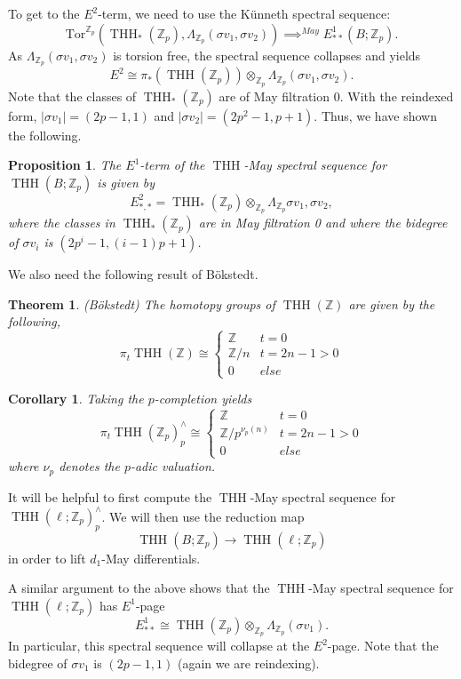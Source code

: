 \documentclass[12pt]{amsart}
\newcommand{\Z}{\mathbb{Z}}
\DeclareMathOperator{\THH}{THH}
\newtheorem{thm}[equation]{Theorem}
\newtheorem{cor}[equation]{Corollary}
\newtheorem{prop}[equation]{Proposition}
\theoremstyle{definition}
\numberwithin{equation}{section}
\numberwithin{figure}{section}
\begin{document}
To get to the $E^2$-term, we need to use the K\"unneth spectral sequence:
\[
\mathrm{Tor}^{\Z_p}(\THH_*(\Z_p), \Lambda_{\Z_p}(\sigma v_1, \sigma v_2))\implies ^{May}E^1_{**}(B;\Z_p).
\]
As $\Lambda_{\Z_p}(\sigma v_1, \sigma v_2)$ is torsion free, the spectral sequence collapses and yields
\[
E^2\cong \pi_*(\THH(\Z_p))\otimes_{\Z_p}\Lambda_{\Z_p}(\sigma v_1, \sigma v_2).
\]
Note that the classes of $\THH_*(\Z_p)$ are of May filtration 0. With the reindexed form, $|\sigma v_1| = (2p-1, 1)$ and $|\sigma v_2| = (2p^2-1,p+1)$. Thus, we have shown the following. 

\begin{prop}
	The $E^1$-term of the $\THH$-May spectral sequence for $\THH(B;\Z_p)$ is given by 
	\[
	E^2_{*,*} = \THH_*(\Z_p)\otimes_{\Z_p}\Lambda_{\Z_p}\sigma v_1, \sigma v_2, 
	\]
	where the classes in $\THH_*(\Z_p)$ are in May filtration 0 and where the bidegree of $\sigma v_i$ is $(2p^i-1, (i-1)p+1)$.
\end{prop}

We also need the following result of B\"okstedt. 

\begin{thm}(B\"okstedt)
	The homotopy groups of $\THH(\Z)$ are given by the following, 
	\[
	\pi_t\THH(\Z)\cong \begin{cases}
		\Z & t=0\\
		\Z/n & t=2n-1>0\\
		0 & else
	\end{cases}
	\]
\end{thm}

\begin{cor}
	Taking the $p$-completion yields 
\[
\pi_t\THH(\Z_p)^\wedge_p\cong \begin{cases}
		\Z & t=0\\
		\Z/p^{\nu_p(n)} & t=2n-1>0\\
		0 & else
	\end{cases}
\]
where $\nu_p$ denotes the $p$-adic valuation.
\end{cor}

It will be helpful to first compute the $\THH$-May spectral sequence for $\THH(\ell;\Z_p)^\wedge_p$. We will then use the reduction map
\[
\THH(B; \Z_p)\to \THH(\ell; \Z_p)
\] 
in order to lift $d_1$-May differentials. 

A similar argument to the above shows that the $\THH$-May spectral sequence for $\THH(\ell; \Z_p)$ has $E^1$-page
\[
E^1_{**} \cong \THH(\Z_p)\otimes_{\Z_p}\Lambda_{\Z_p}(\sigma v_1).
\]
In particular, this spectral sequence will collapse at the $E^2$-page. Note that the bidegree of $\sigma v_1$ is $(2p-1,1)$ (again we are reindexing).
\end{document}
